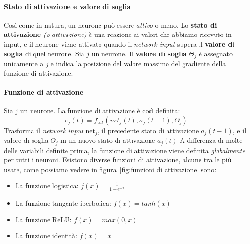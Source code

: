 \documentclass[12pt, twoside, letterpaper]{report}
\begin{document}
			 \paragraph{Stato di attivazione e valore di soglia} Così come in natura, un neurone può essere \textit{attivo} o meno. Lo \textbf{stato di attivazione} \textit{(o attivazione)} è una reazione ai valori che abbiamo ricevuto in input, e il neurone viene attivato quando il \textit{network input} supera il \textbf{valore di soglia} di quel neurone. Sia $j$ un neurone. Il \textbf{valore di soglia} $\Theta_j$ è assegnato unicamente a $j$ e indica la posizione del valore massimo del gradiente della funzione di attivazione.
			 
			 \paragraph{Funzione di attivazione} Sia $j$ un neurone. La funzione di attivazione è così definita: $$a_j(t) = f_{act}(net_j(t),a_j(t-1), \Theta_j)$$
			 	Trasforma il \textit{network input} net$_j$, il precedente stato di attivazione $a_j(t-1)$, e il valore di soglia $\Theta_j$ in un nuovo stato di attivazione $a_j(t)$ 
			 	A differenza di molte delle variabili definite prima, la funzione di attivazione viene definita \textit{globalmente} per tutti i neuroni. Esistono diverse funzioni di attivazione, alcune tra le più usate, come possiamo vedere in figura~\ref{fig:funzioni di attivazione} sono: 
			 	\begin{itemize}
			 		\item La funzione logistica: $f(x) = \frac{1}{1+e^{-x}}$
			 		\item La funzione tangente iperbolica: $f(x) = tanh(x)$
			 		\item La funzione ReLU: $f(x) = max(0,x)$
			 		\item La funzione identità: $f(x) = x$
			 	\end{itemize}
			 	
\end{document}
